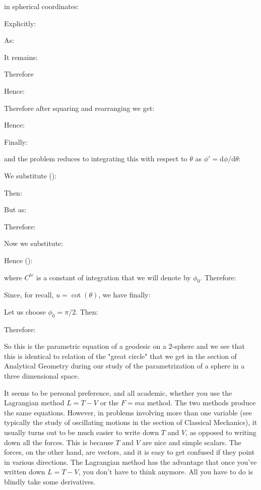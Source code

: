 	\begin{tcolorbox}[colframe=black,colback=white,sharp corners]
	in spherical coordinates:
	
	Explicitly:
	
	As:
	
	It remains:
	
	Therefore
	
	Hence:
	
	Therefore after squaring and rearranging we get:
	
	Hence:
	
	Finally:
	
	and the problem reduces to integrating this with respect to $\theta$ as $\phi'=\mathrm{d}\phi/\mathrm{d}\theta$:
	
	We substitute ():
	
	Then:
	\end{tcolorbox}
	
	\begin{tcolorbox}[colframe=black,colback=white,sharp corners]
	
	But as:
	
	Therefore:
	
	Now we substitute:
	
	Hence ():
	
	where $C^{te}$ is a constant of integration that we will denote by $\phi_0$. Therefore:
	
	Since, for recall, $u=\cot(\theta)$, we have finally:
	
	Let us choose $\phi_0=\pi/2$. Then:
	
	Therefore:
	
	So this is the parametric equation of a geodesic on a $2$-sphere and we see that this is identical to relation of the "great circle" that we get in the section of Analytical Geometry during our study of the parametrization of a sphere in a three dimensional space.
	\end{tcolorbox}
	
	\pagebreak
	It seems to be personal preference, and all academic, whether you use the Lagrangian method $L=T-V$ or the $F = ma$ method. The two methods produce the same equations. However, in problems involving more than one variable (see typically the study of oscillating motions in the section of Classical Mechanics), it usually turns out to be much easier to write down $T$ and $V$, as opposed to writing down all the forces. This is because $T$ and $V$ are nice and simple scalars. The forces, on the other hand, are vectors, and it is easy to get confused if they point in various directions. The Lagrangian method has the advantage that once you've written down $L=T-V$, you don't have to think anymore. All you have to do is blindly take some derivatives.
	
